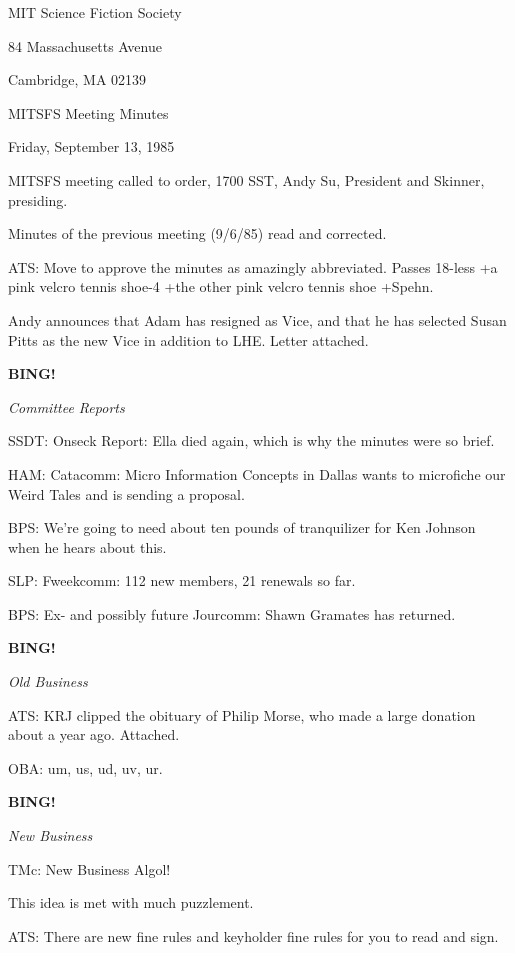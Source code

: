 \documentclass[12pt]{article}
\newcommand{\bing}{{\bf BING!} }
\newcommand{\goto}[1]{\bing \vskip 12pt \centerline{{\em{#1}}}}
\begin{document}
\begin{center}

MIT Science Fiction Society 

84 Massachusetts Avenue

Cambridge, MA 02139

\vspace{12pt}

MITSFS Meeting Minutes 

Friday, September 13, 1985

\end{center}
 
\vspace{18pt}

\setlength{\parskip}{6pt}

\noindent
MITSFS meeting called to order, 1700 SST,
Andy Su, President and Skinner, presiding.

Minutes of the previous meeting (9/6/85) read and corrected.

ATS: Move to approve the minutes as amazingly abbreviated. Passes 18-less +a pink velcro tennis shoe-4 +the other pink velcro tennis shoe +Spehn.

Andy announces that Adam has resigned as Vice, and that he has selected Susan Pitts as the new Vice in addition to LHE. Letter attached.

\goto{Committee Reports}

SSDT: Onseck Report: Ella died again, which is why the minutes were so brief.

HAM: Catacomm: Micro Information Concepts in Dallas wants to microfiche our Weird Tales and is sending a proposal.

BPS: We're going to need about ten pounds of tranquilizer for Ken Johnson when he hears about this.

SLP: Fweekcomm: 112 new members, 21 renewals so far.

BPS: Ex- and possibly future Jourcomm: Shawn Gramates has returned.

\goto{Old Business}

ATS: KRJ clipped the obituary of Philip Morse, who made a large donation about a year ago. Attached.

OBA: um, us, ud, uv, ur.

\goto{New Business}

TMc: New Business Algol!

This idea is met with much puzzlement.

ATS: There are new fine rules and keyholder fine rules for you to read and sign.
\end{document}
